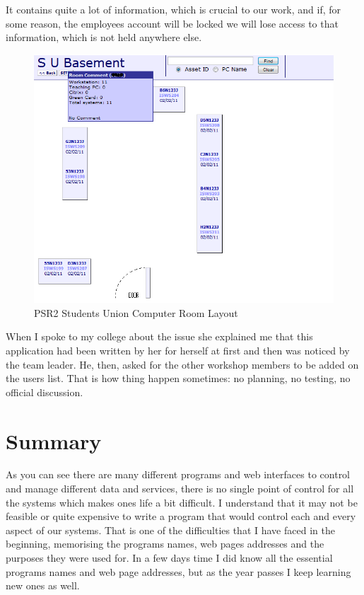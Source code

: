 \documentclass[10pt,a4paper,headinclude=true]{report}
\begin{document}
It contains quite a lot of information, which is crucial to our work, and if, for some reason, the employees account will be locked we will lose access to that information, which is not held anywhere else.

\begin{figure}[H]
\includegraphics[scale=0.5]{./PSR2_SU_Room_layout}
\caption{PSR2 Students Union Computer Room Layout}
\label{fig:PSR2_SU_Room_layout}
\end{figure}

When I spoke to my college about the issue she explained me that this application had been written by her for herself at first and then was noticed by the team leader. He, then, asked for the other workshop members to be added on the users list. That is how thing happen sometimes: no planning, no testing, no official discussion.

\section{Summary}
As you can see there are many different programs and web interfaces to control and manage different data and services, there is no single point of control for all the systems which makes ones life a bit difficult. I understand that it may not be feasible or quite expensive to write a program that would control each and every aspect of our systems. That is one of the difficulties that I have faced in the beginning, memorising the programs names, web pages addresses and the purposes they were used for. In a few days time I did know all the essential programs names and web page addresses, but as the year passes I keep learning new ones as well.   
\end{document}
